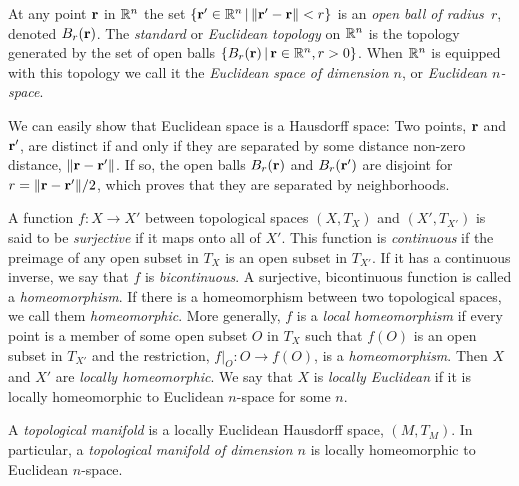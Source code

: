 \documentclass[11pt]{article}
\numberwithin{equation}{section}
\begin{document}
\begin{dfn}
At any point $\mathbf{r}$ in $\mathbb{R}^n$ the set $\{\mathbf{r}'\in\mathbb{R}^n\,|\,\|\mathbf{r}'-\mathbf{r}\|<r\}$ is an \textit{open ball of radius~$r$}, denoted $B_r(\mathbf{r})$.
The \textit{standard} or \textit{Euclidean topology} on $\mathbb{R}^n$ is the topology generated by the set of open balls $\{B_r(\mathbf{r})\,|\,\mathbf{r}\in\mathbb{R}^n, r>0\}$.
When $\mathbb{R}^n$ is equipped with this topology we call it the \textit{Euclidean space of dimension $n$}, or \textit{Euclidean $n$-space}.
\end{dfn}

\begin{ex}
We can easily show that Euclidean space is a Hausdorff space:
Two points, $\mathbf{r}$ and $\mathbf{r}'$, are distinct if and only if they are separated by some distance non-zero distance, $\|\mathbf{r}-\mathbf{r}'\|$.
If so, the open balls $B_r(\mathbf{r})$ and $B_r(\mathbf{r}')$ are disjoint for $r=\|\mathbf{r}-\mathbf{r}'\|/2$, which proves that they are separated by neighborhoods.
\end{ex}


\begin{dfn}
A function $f:X\rightarrow X'$ between topological spaces $(X,T_X)$ and $(X',T_{X'})$ is said to be \textit{surjective} if it maps onto all of $X'$.\footnotemark
{}
This function is \textit{continuous} if the preimage of any open subset in $T_X$ is an open subset in $T_{X'}$.\footnotemark
{}
If it has a continuous inverse, we say that $f$ is \textit{bicontinuous}.
A surjective, bicontinuous function is called a \textit{homeomorphism}.
If there is a homeomorphism between two topological spaces, we call them \textit{homeomorphic}.
More generally, $f$ is a \textit{local homeomorphism} if every point is a member of some open subset $O$ in $T_X$ such that $f(O)$ is an open subset in $T_{X'}$ and the restriction, $f|_O:O\rightarrow f(O)$, is a \textit{homeomorphism}.
Then $X$ and $X'$ are \textit{locally homeomorphic}.
We say that $X$ is \textit{locally Euclidean} if it is locally homeomorphic to Euclidean $n$-space for some $n$.
\end{dfn}

\begin{dfn}
A \textit{topological manifold} is a locally Euclidean Hausdorff space, $(M, T_M)$.
In particular, a \textit{topological manifold of dimension $n$} is locally homeomorphic to Euclidean $n$-space.
\end{dfn}
\end{document}
